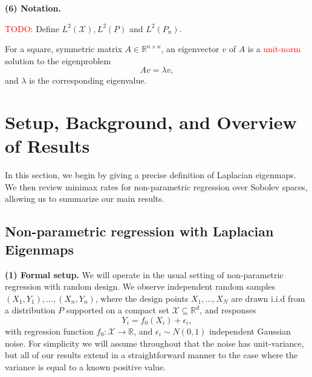 \documentclass{article}
\newcommand{\Reals}{\mathbb{R}}
\newcommand{\1}{\mathbf{1}}
\newcommand{\Rd}{\Reals^d}
\newcommand{\Leb}{L}
\newcommand{\mc}[1]{\mathcal{#1}}
\theoremstyle{alden}
\theoremstyle{aldenthm}
\theoremstyle{definition}
\theoremstyle{remark}
\begin{document}
\textbf{(6) Notation.}

\textcolor{red}{TODO}: Define $\Leb^2(\mc{X}), \Leb^2(P)$ and $\Leb^2(P_n)$. 


For a square, symmetric matrix $A \in \Reals^{n \times n}$, an eigenvector $v$ of $A$ is a \textcolor{red}{unit-norm} solution to the eigenproblem
\begin{equation*}
Av = \lambda v,
\end{equation*}
and $\lambda$ is the corresponding eigenvalue.

\section{Setup, Background, and Overview of Results}
\label{sec:setup_main_results}

In this section, we begin by giving a precise definition of Laplacian eigenmaps. We then review minimax rates for non-parametric regression over Sobolev spaces, allowing us to summarize our main results. 

\subsection{Non-parametric regression with Laplacian Eigenmaps}
\label{sec:regression_laplacian_eigenmaps}

\textbf{(1) Formal setup.}
We will operate in the usual setting of non-parametric regression with random design. We observe independent random samples $(X_1,Y_1),\ldots,(X_n,Y_n)$, where the design points $X_1,\ldots,X_N$ are drawn i.i.d from a distribution $P$ supported on a compact set $\mc{X} \subseteq \Rd$, and responses
\begin{equation}
\label{eqn:model}
Y_i = f_0(X_i) + \epsilon_i,
\end{equation}
with regression function $f_0: \mc{X} \to \Reals$, and $\epsilon_i \sim N(0,1)$ independent Gaussian noise. For simplicity we will assume throughout that the noise has unit-variance, but all of our results extend in a straightforward manner to the case where the variance is equal to a known positive value. 
\end{document}
